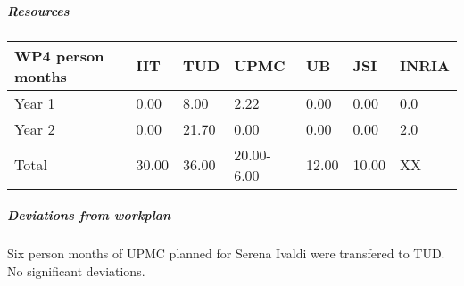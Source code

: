
\subparagraph{Resources}

\begin{center}
\begin{tabular}{|C{1.5cm}|C{1.5cm}|C{1.5cm}|C{2cm}|C{2cm}|C{2cm}|C{2cm}|}
\hline
\footnotesize \textbf{WP4 person months}& \footnotesize \textbf{IIT}&\footnotesize \textbf{TUD}&\footnotesize \textbf{UPMC}& \footnotesize \textbf{UB} &\footnotesize \textbf{JSI} &\footnotesize \textbf{INRIA}\\ \hline
\footnotesize Year 1 &  0.00 & 8.00 & 2.22 & 0.00 & 0.00 & 0.0     \\  \hline
\footnotesize Year 2 &  0.00 & 21.70 & 0.00 & 0.00 & 0.00 & 2.0     \\  \hline
\footnotesize Total &  30.00 & 36.00 & 20.00-6.00 & 12.00 & 10.00 & XX \\ \hline
\end{tabular}
\end{center}

\subparagraph{Deviations from workplan} 
Six person months of UPMC planned for Serena Ivaldi were transfered to TUD. No significant deviations. 
